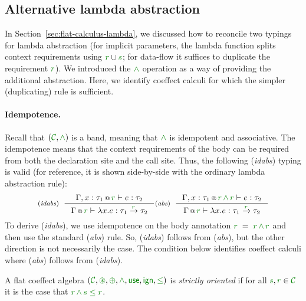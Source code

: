 
\subsection{Alternative lambda abstraction}

In Section~\ref{sec:flat-calculus-lambda}, we discussed how to reconcile two typings for
lambda abstraction (for implicit parameters, the lambda function splits context requirements
using $\cclrd{r} \cup \cclrd{s}$; for data-flow it suffices to duplicate the requirement 
$\cclrd{r}$). We introduced the $\czip$ operation as a way of providing the additional abstraction.
Here, we identify coeffect calculi for which the simpler (duplicating) rule is sufficient.

\paragraph{Idempotence.}
Recall that $(\C, \czip)$ is a band, meaning that $\czip$  is idempotent and associative. The 
idempotence means that the context requirements of the body can be required from both the 
declaration site and the call site. Thus, the following (\emph{idabs}) typing is valid 
(for reference, it is shown side-by-side with the ordinary lambda abstraction rule):
%
\begin{equation*}
\tyrule{idabs}
  {\coctx{\Gamma, x:\tau_1}{\cclrd{r}} \vdash e : \tau_2}
  {\coctx{\Gamma}{\cclrd{r}} \vdash \lambda x.e : \tau_1 \xrightarrow{\cclrd{r}} \tau_2 }
\tyrule{abs}
  {\coctx{\Gamma, x:\tau_1}{\cclrd{r}\,\czip\,\cclrd{r}} \vdash e : \tau_2}
  {\coctx{\Gamma}{\cclrd{r}} \vdash \lambda x.e : \tau_1 \xrightarrow{\cclrd{r}} \tau_2 }
\end{equation*}
% 
To derive (\emph{idabs}), we use idempotence on the body annotation $\cclrd{r}\;=\;\cclrd{r}\,\czip\,\cclrd{r}$
and then use the standard (\emph{abs}) rule. So, (\emph{idabs}) follows from (\emph{abs}), 
but the other direction is not necessarily the case. The condition below identifies 
coeffect calculi where (\emph{abs}) follows from (\emph{idabs}).

\begin{definition}
A flat coeffect algebra $(\C, \cseq, \cpar, \czip, \cunit, \czero, \cleq)$ is \emph{strictly oriented} if for all
$\cclrd{s}, \cclrd{r} \in \C$ it is the case that $\cclrd{r} \,\czip\, \cclrd{s} \;\cleq\; \cclrd{r}$.
\end{definition}

